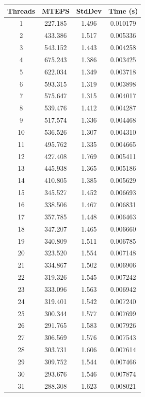\documentclass[10pt,twocolumn,letterpaper]{article}
\begin{document}
\begin{table}[h]
\renewcommand\arraystretch{0.8}
\centering
\begin{tabular}{@{}c|ccc@{}}
\toprule
Threads          & MTEPS  & StdDev     & Time (s)      \\ \midrule
1 & 227.185 & 1.496 & 0.010179 \\
2 & 433.386 & 1.517 & 0.005336 \\
3 & 543.152 & 1.443 & 0.004258 \\
4 & 675.243 & 1.386 & 0.003425 \\
5 & 622.034 & 1.349 & 0.003718 \\
6 & 593.315 & 1.319 & 0.003898 \\
7 & 575.647 & 1.315 & 0.004017 \\
8 & 539.476 & 1.412 & 0.004287 \\
9 & 517.574 & 1.336 & 0.004468 \\
10 & 536.526 & 1.307 & 0.004310 \\
11 & 495.762 & 1.335 & 0.004665 \\
12 & 427.408 & 1.769 & 0.005411 \\
13 & 445.938 & 1.365 & 0.005186 \\
14 & 410.805 & 1.385 & 0.005629 \\
15 & 345.527 & 1.452 & 0.006693 \\
16 & 338.506 & 1.467 & 0.006831 \\
17 & 357.785 & 1.448 & 0.006463 \\
18 & 347.207 & 1.465 & 0.006660 \\
19 & 340.809 & 1.511 & 0.006785 \\
20 & 323.520 & 1.554 & 0.007148 \\
21 & 334.867 & 1.502 & 0.006906 \\
22 & 319.326 & 1.545 & 0.007242 \\
23 & 333.096 & 1.563 & 0.006942 \\
24 & 319.401 & 1.542 & 0.007240 \\
25 & 300.344 & 1.577 & 0.007699 \\
26 & 291.765 & 1.583 & 0.007926 \\
27 & 306.569 & 1.576 & 0.007543 \\
28 & 303.731 & 1.606 & 0.007614 \\
29 & 309.752 & 1.544 & 0.007466 \\
30 & 293.676 & 1.546 & 0.007874 \\
31 & 288.308 & 1.623 & 0.008021 \\

\end{tabular}
\end{table}
\end{document}
